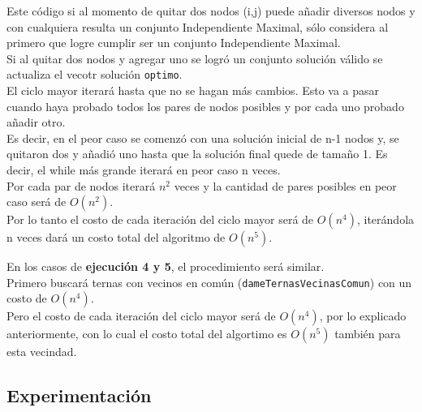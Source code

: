 Este c\'odigo si al momento de quitar dos nodos (i,j) puede a\~nadir diversos nodos y con cualquiera resulta un conjunto Independiente Maximal, s\'olo considera al primero que logre cumplir ser un conjunto Independiente Maximal.\\

Si al quitar dos nodos y agregar uno se logr\'o un conjunto soluci\'on v\'alido se actualiza el vecotr soluci\'on \texttt{optimo}.\\

El ciclo mayor iterar\'a hasta que no se hagan m\'as cambios. Esto va a pasar cuando haya probado todos los pares de nodos posibles y por cada uno probado a\~nadir otro.\\

Es decir, en el peor caso se comenz\'o con una soluci\'on inicial de n-1 nodos y, se quitaron dos y a\~nadi\'o uno hasta que la soluci\'on final quede de tama\~no 1. Es decir, el while m\'as grande iterar\'a en peor caso n veces.\\

Por cada par de nodos iterar\'a $n^2$ veces y la cantidad de pares posibles en peor caso ser\'a de $O(n^2)$.\\

Por lo tanto el costo de cada iteraci\'on del ciclo mayor ser\'a de $O(n^4)$, iter\'andola n veces dar\'a un costo total del algoritmo de $O(n^5)$.\\

\bigskip	

En los casos de \textbf{ejecuci\'on 4 y 5}, el procedimiento ser\'a similar.\\

Primero buscar\'a ternas con vecinos en com\'un (\texttt{dameTernasVecinasComun}) con un costo de $O(n^4)$.\\

Pero el costo de cada iteraci\'on del ciclo mayor ser\'a de $O(n^4)$, por lo explicado anteriormente, con lo cual el costo total del algortimo es $O(n^5)$ tambi\'en para esta vecindad. 


\newpage
\subsection{Experimentaci\'on}

